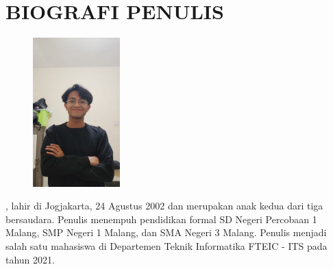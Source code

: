 \chapter*{BIOGRAFI PENULIS}


\vspace{2ex}

\begin{figure}
  \centering
  \vspace{-3ex}
  \includegraphics[width=0.3\textwidth]{gambar/self-image.jpeg}
  \vspace{-4ex}
\end{figure}

\noindent\name{}, lahir di Jogjakarta, 24 Agustus 2002 dan merupakan anak kedua dari
tiga bersaudara. Penulis menempuh pendidikan formal SD Negeri Percobaan 1
Malang, SMP Negeri 1 Malang, dan SMA Negeri 3 Malang. Penulis menjadi
salah satu mahasiswa di Departemen Teknik Informatika FTEIC - ITS pada
tahun 2021.
